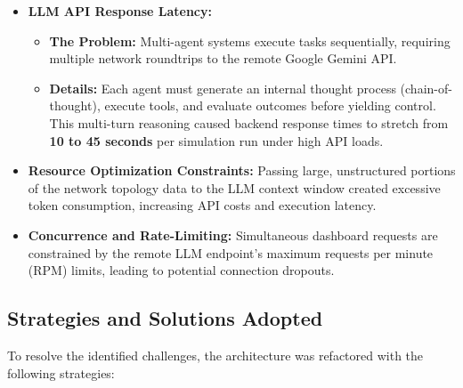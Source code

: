 \begin{itemize}
    \item \textbf{LLM API Response Latency:}
    \begin{itemize}
        \item \textbf{The Problem:} Multi-agent systems execute tasks sequentially, requiring multiple network roundtrips to the remote Google Gemini API. 
        \item \textbf{Details:} Each agent must generate an internal thought process (chain-of-thought), execute tools, and evaluate outcomes before yielding control. This multi-turn reasoning caused backend response times to stretch from \textbf{10 to 45 seconds} per simulation run under high API loads.
    \end{itemize}
    \item \textbf{Resource Optimization Constraints:} Passing large, unstructured portions of the network topology data to the LLM context window created excessive token consumption, increasing API costs and execution latency.
    \item \textbf{Concurrence and Rate-Limiting:} Simultaneous dashboard requests are constrained by the remote LLM endpoint's maximum requests per minute (RPM) limits, leading to potential connection dropouts.
\end{itemize}

\subsection[Strategies and Solutions Adopted]{Strategies and Solutions Adopted}
To resolve the identified challenges, the architecture was refactored with the following strategies:

